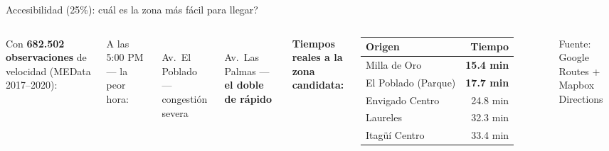 \documentclass[aspectratio=169, 11pt]{beamer}
\begin{document}
\begin{frame}{\textcolor{acc}{Accesibilidad (25\%)}: \textquestiondown cu\'{a}l es la zona m\'{a}s f\'{a}cil para llegar?}

\begin{columns}[T]
\vspace{2pt}
{\scriptsize Con \textcolor{acc}{\textbf{682.502 observaciones}} de velocidad (MEData 2017--2020):}

\vspace{4pt}
{\small A las 5:00 PM --- la peor hora:}

\vspace{4pt}
\\[1pt]
{\tiny Av.\ El Poblado --- congesti\'{o}n severa}

\vspace{4pt}
\\[1pt]
{\tiny Av.\ Las Palmas --- \textbf{el doble de r\'{a}pido}}

\vspace{2pt}
{\scriptsize\textbf{Tiempos reales a la zona candidata:}}
\vspace{2pt}

{\scriptsize
\begin{tabular}{@{}lr@{}}
\toprule
\textbf{Origen} & \textbf{Tiempo} \\
\midrule
\rowcolor{acc!8}
Milla de Oro & \textcolor{acc}{\textbf{15.4 min}} \\
El Poblado (Parque) & \textcolor{acc}{\textbf{17.7 min}} \\
Envigado Centro & 24.8 min \\
Laureles & 32.3 min \\
Itag\"{u}\'{i} Centro & 33.4 min \\
\bottomrule
\end{tabular}
}

\vspace{2pt}
{\tiny\color{slate} Fuente: Google Routes + Mapbox Directions}


\end{columns}
\end{frame}
\end{document}
